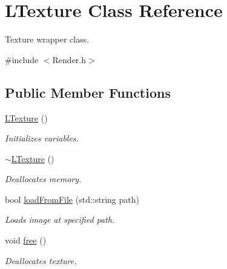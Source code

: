 \hypertarget{class_l_texture}{}\section{L\+Texture Class Reference}
\label{class_l_texture}


Texture wrapper class.  




{\ttfamily \#include $<$Render.\+h$>$}

\subsection*{Public Member Functions}
\begin{DoxyCompactItemize}
\item 
\mbox{\label{class_l_texture_a12fbc9278f97388cce5ce18863b462ff}} 
\hyperlink{class_l_texture_a12fbc9278f97388cce5ce18863b462ff}{L\+Texture} ()
\begin{DoxyCompactList}\small\item\em Initializes variables. \end{DoxyCompactList}\item 
\mbox{\label{class_l_texture_a49cfe57c36e58ad99c1ea73fc274b77b}} 
\hyperlink{class_l_texture_a49cfe57c36e58ad99c1ea73fc274b77b}{$\sim$\+L\+Texture} ()
\begin{DoxyCompactList}\small\item\em Deallocates memory. \end{DoxyCompactList}\item 
\mbox{\label{class_l_texture_ae5b2b930a619203755988c16d6403665}} 
bool \hyperlink{class_l_texture_ae5b2b930a619203755988c16d6403665}{load\+From\+File} (std\+::string path)
\begin{DoxyCompactList}\small\item\em Loads image at specified path. \end{DoxyCompactList}\item 
\mbox{\label{class_l_texture_abef558f0b920270079925548a3976a06}} 
void \hyperlink{class_l_texture_abef558f0b920270079925548a3976a06}{free} ()
\begin{DoxyCompactList}\small\item\em Deallocates texture. \end{DoxyCompactList}\item 

\end{DoxyCompactItemize}

